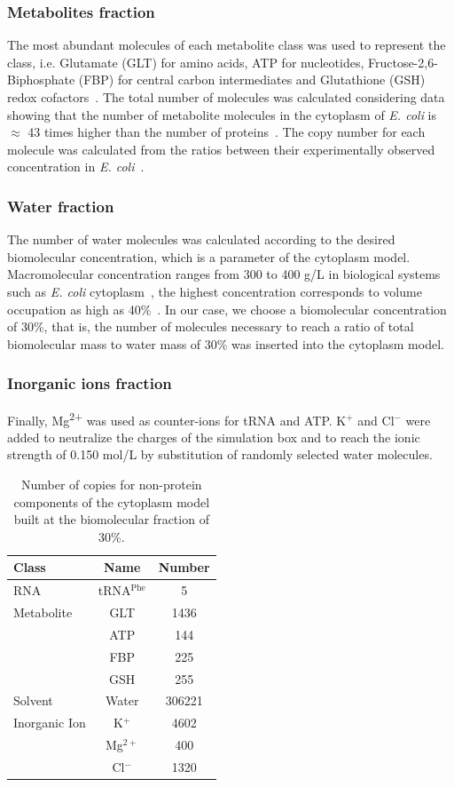 \documentclass[journal=jpcisd8,manuscript=article]{achemso}
\begin{document}
\subsubsection{Metabolites fraction}
The most abundant molecules of each metabolite class was used to 
represent the class, i.e. Glutamate (GLT) for amino acids, ATP for
nucleotides, Fructose-2,6-Biphosphate (FBP) for central carbon
intermediates and Glutathione (GSH) redox
cofactors~\cite{Bennett2009}. The total number of molecules was
calculated considering data showing that the number of metabolite
molecules in the cytoplasm of \textit{E. coli} is $\approx$ 43 times
higher than the number of proteins~\cite{Bennett2009}. The copy number
for each molecule was calculated from the ratios between their
experimentally observed concentration in {\em
  E. coli}~\cite{Bennett2009}.

\subsubsection{Water fraction}
The number of water molecules was calculated according to the desired
biomolecular concentration, which is a parameter of the cytoplasm
model. Macromolecular concentration ranges from 300 to 400 g/L in biological systems
such as \textit{E. coli} cytoplasm~\cite{Zimmerman1991}, the highest concentration corresponds to volume occupation as high as 40\%~\cite{Ellis2003a}. In our case, we
choose a biomolecular concentration of 30\%, that is, the number of
molecules necessary to reach a ratio of total biomolecular mass to
water mass of 30\% was inserted into the cytoplasm model.

\subsubsection{Inorganic ions fraction}
Finally, Mg\textsuperscript{2+} was used as counter-ions for tRNA and
ATP. K$^{+}$ and Cl$^{-}$ were added to neutralize the charges of the
simulation box and to reach the ionic strength of 0.150 mol/L by
substitution of randomly selected water molecules.



\begin{table}
\centering
\begin{tabular}{lcc}
\hline
Class & Name & Number\\
\hline
RNA & tRNA$^{\text{Phe}}$ & 5\\
\hline
Metabolite & GLT & 1436\\
  & ATP & 144\\
  & FBP & 225\\
  & GSH & 255\\
\hline
Solvent & Water & 306221\\
\hline
Inorganic Ion & K$^{+}$ & 4602\\
  & Mg$^{2+}$ & 400\\
  & Cl$^{-}$ & 1320\\
\hline
\end{tabular}
\caption{Number of copies for non-protein components of the cytoplasm model built at the biomolecular fraction of 30\%.}
\label{tbl:soup_components}
\end{table}
\end{document}
